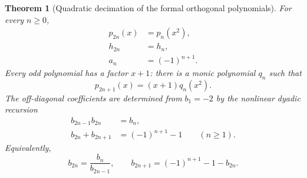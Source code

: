 \documentclass[11pt,oneside]{article}
\newtheorem{theorem}{Theorem}[section]
\theoremstyle{definition}
\begin{document}
\begin{theorem}[Quadratic decimation of the formal orthogonal polynomials]
\label{p3:thm:tm-quadratic-op}
For every \(n\ge0\),
\begin{align}
 p_{2n}(x)&=p_n(x^2),                                      \label{p3:eq:p-even-decimation}\\
 h_{2n}&=h_n,                                              \label{p3:eq:h-even-decimation}\\
 a_n&=(-1)^{n+1}.                                          \label{p3:eq:a-alternating}
\end{align}
Every odd polynomial has a factor \(x+1\): there is a monic polynomial \(q_n\) such that
\begin{equation}
 p_{2n+1}(x)=(x+1)q_n(x^2).                                \label{p3:eq:p-odd-factor}
\end{equation}
The off-diagonal coefficients are determined from \(b_1=-2\) by the nonlinear dyadic
recursion
\begin{align}
 b_{2n-1}b_{2n}&=b_n,                                      \label{p3:eq:b-product-rec}\\
 b_{2n}+b_{2n+1}&=(-1)^{n+1}-1\qquad(n\ge1).               \label{p3:eq:b-sum-rec}
\end{align}
Equivalently,
\begin{equation}
 b_{2n}=\frac{b_n}{b_{2n-1}},
 \qquad
 b_{2n+1}=(-1)^{n+1}-1-b_{2n}.                             \label{p3:eq:b-explicit-rec}
\end{equation}
\end{theorem}
\end{document}
